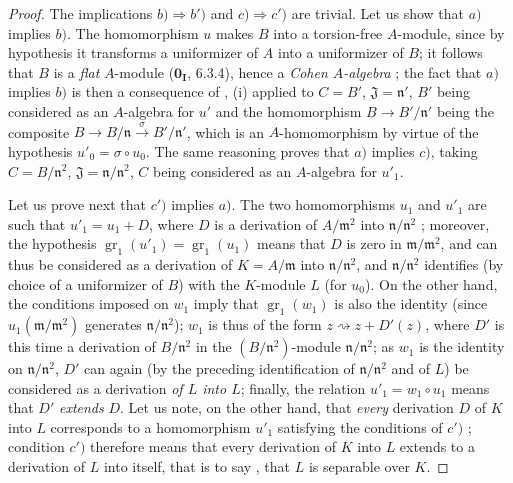 \begin{proof}
The implications $b)\Rightarrow b')$ and $c)\Rightarrow c')$ are trivial.
Let us show that $a)$ implies $b)$.
The homomorphism $u$ makes $B$ into a torsion-free $A$-module, since by hypothesis it transforms a uniformizer of $A$ into a uniformizer of $B$; it follows that $B$ is a \emph{flat} $A$-module ($\mathbf{0_I}$, 6.3.4), hence a \emph{Cohen $A$-algebra} ; the fact that $a)$ implies $b)$ is then a consequence of , (i) applied to $C=B'$, $\mathfrak{J}=\mathfrak{n}'$, $B'$ being considered as an $A$-algebra for $u'$ and the homomorphism $B\to B'/\mathfrak{n}'$ being the composite $B\to B/\mathfrak{n}\xrightarrow{\sigma} B'/\mathfrak{n}'$, which is an $A$-homomorphism by virtue of the hypothesis $u'_0=\sigma\circ u_0$.
The same reasoning proves that $a)$ implies $c)$, taking $C=B/\mathfrak{n}^2$, $\mathfrak{J}=\mathfrak{n}/\mathfrak{n}^2$, $C$ being considered as an $A$-algebra for $u'_1$.

Let us prove next that $c')$ implies $a)$.
The two homomorphisms $u_1$ and $u'_1$ are such that $u'_1=u_1+D$, where $D$ is a derivation of $A/\mathfrak{m}^2$ into $\mathfrak{n}/\mathfrak{n}^2$ ; moreover, the hypothesis $\operatorname{gr}_1(u'_1)=\operatorname{gr}_1(u_1)$ means that $D$ is zero in $\mathfrak{m}/\mathfrak{m}^2$, and can thus be considered as a derivation of $K=A/\mathfrak{m}$ into $\mathfrak{n}/\mathfrak{n}^2$, and $\mathfrak{n}/\mathfrak{n}^2$ identifies (by choice of a uniformizer of $B$) with the $K$-module $L$ (for $u_0$).
On the other hand, the conditions imposed on $w_1$ imply that $\operatorname{gr}_1(w_1)$ is also the identity (since $u_1(\mathfrak{m}/\mathfrak{m}^2)$ generates $\mathfrak{n}/\mathfrak{n}^2$);
$w_1$ is thus of the form $z\rightsquigarrow z+D'(z)$, where $D'$ is this time a derivation of $B/\mathfrak{n}^2$ in the $(B/\mathfrak{n}^2)$-module $\mathfrak{n}/\mathfrak{n}^2$; as $w_1$ is the identity on $\mathfrak{n}/\mathfrak{n}^2$, $D'$ can again (by the preceding identification of $\mathfrak{n}/\mathfrak{n}^2$ and of $L$) be considered as a derivation \emph{of $L$ into $L$};
finally, the relation $u'_1=w_1\circ u_1$ means that $D'$ \emph{extends} $D$.
Let us note, on the other hand, that \emph{every} derivation $D$ of $K$ into $L$ corresponds to a homomorphism $u'_1$ satisfying the conditions of $c')$ ; condition $c')$ therefore means that every derivation of $K$ into $L$ extends to a derivation of $L$ into itself, that is to say , that $L$ is separable over $K$.


\end{proof}
